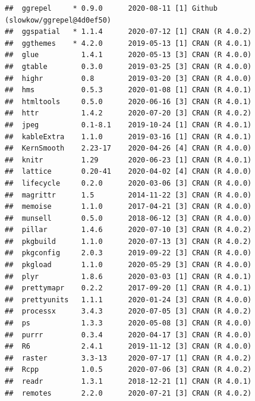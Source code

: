 \documentclass[
  french,
]{book}
\begin{document}
\begin{verbatim}
##  ggrepel     * 0.9.0      2020-08-11 [1] Github (slowkow/ggrepel@4d0ef50)  
##  ggspatial   * 1.1.4      2020-07-12 [1] CRAN (R 4.0.2)                    
##  ggthemes    * 4.2.0      2019-05-13 [1] CRAN (R 4.0.1)                    
##  glue          1.4.1      2020-05-13 [3] CRAN (R 4.0.0)                    
##  gtable        0.3.0      2019-03-25 [3] CRAN (R 4.0.0)                    
##  highr         0.8        2019-03-20 [3] CRAN (R 4.0.0)                    
##  hms           0.5.3      2020-01-08 [1] CRAN (R 4.0.1)                    
##  htmltools     0.5.0      2020-06-16 [3] CRAN (R 4.0.1)                    
##  httr          1.4.2      2020-07-20 [3] CRAN (R 4.0.2)                    
##  jpeg          0.1-8.1    2019-10-24 [1] CRAN (R 4.0.1)                    
##  kableExtra    1.1.0      2019-03-16 [1] CRAN (R 4.0.1)                    
##  KernSmooth    2.23-17    2020-04-26 [4] CRAN (R 4.0.0)                    
##  knitr         1.29       2020-06-23 [1] CRAN (R 4.0.1)                    
##  lattice       0.20-41    2020-04-02 [4] CRAN (R 4.0.0)                    
##  lifecycle     0.2.0      2020-03-06 [3] CRAN (R 4.0.0)                    
##  magrittr      1.5        2014-11-22 [3] CRAN (R 4.0.0)                    
##  memoise       1.1.0      2017-04-21 [3] CRAN (R 4.0.0)                    
##  munsell       0.5.0      2018-06-12 [3] CRAN (R 4.0.0)                    
##  pillar        1.4.6      2020-07-10 [3] CRAN (R 4.0.2)                    
##  pkgbuild      1.1.0      2020-07-13 [3] CRAN (R 4.0.2)                    
##  pkgconfig     2.0.3      2019-09-22 [3] CRAN (R 4.0.0)                    
##  pkgload       1.1.0      2020-05-29 [3] CRAN (R 4.0.0)                    
##  plyr          1.8.6      2020-03-03 [1] CRAN (R 4.0.1)                    
##  prettymapr    0.2.2      2017-09-20 [1] CRAN (R 4.0.1)                    
##  prettyunits   1.1.1      2020-01-24 [3] CRAN (R 4.0.0)                    
##  processx      3.4.3      2020-07-05 [3] CRAN (R 4.0.2)                    
##  ps            1.3.3      2020-05-08 [3] CRAN (R 4.0.0)                    
##  purrr         0.3.4      2020-04-17 [3] CRAN (R 4.0.0)                    
##  R6            2.4.1      2019-11-12 [3] CRAN (R 4.0.0)                    
##  raster        3.3-13     2020-07-17 [1] CRAN (R 4.0.2)                    
##  Rcpp          1.0.5      2020-07-06 [3] CRAN (R 4.0.2)                    
##  readr         1.3.1      2018-12-21 [1] CRAN (R 4.0.1)                    
##  remotes       2.2.0      2020-07-21 [3] CRAN (R 4.0.2)                    

\end{verbatim}
\end{document}
